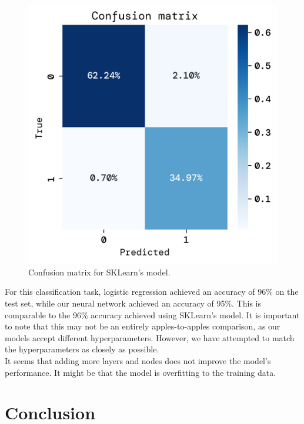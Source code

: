\documentclass[twoside,11pt]{report}
\begin{document}
\begin{figure}[!ht]
\begin{minipage}[t]{0.5\textwidth - 1mm}
\begin{center}
                \includegraphics[width=\textwidth]{../runsAndFigures/confusion_matrix_sklearn.png}
            \end{center}
            \caption
            {
                Confusion matrix for SKLearn's model.
            }\label{fig:confusion_matrix_sklearn}
        \end{minipage}
    \end{figure}

    \noindent
    For this classification task, logistic regression achieved an accuracy of 96\% on the test set,
    while our neural network achieved an accuracy of 95\%. This is comparable to the 96\% accuracy achieved using
    SKLearn's model. It is important to note that this may not be an entirely apples-to-apples comparison, as our models
    accept different hyperparameters. However, we have attempted to match the hyperparameters as closely as possible.
    \\
    It seems that adding more layers and nodes does not improve the model's performance.
    It might be that the model is overfitting to the training data.
    
\section{Conclusion}
\label{sec:conclusion}
\end{document}

